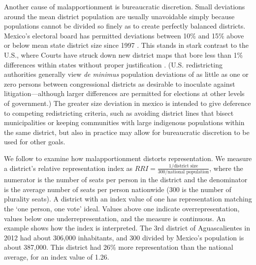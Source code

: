 \documentclass[letter,12pt]{article}
\begin{document}
{Another cause of malapportionment is bureaucratic discretion. Small deviations around the mean district population are usually unavoidable simply because populations cannot be divided so finely as to create perfectly balanced districts. Mexico's electoral board has permitted deviations between 10\% and 15\% above or below mean state district size since 1997 \citep{lujambio.vives.2008,trelles.mtz.polygob2012}. This stands in stark contrast to the U.S., where Courts have struck down new district maps that bore less than 1\% differences within states without proper justification \citep{tuckerApportionment.1985}.  (U.S. redistricting authorities generally view \emph{de minimus} population deviations of as little as one or zero persons between congressional districts as desirable to inoculate against litigation---although larger differences are permitted for elections at other levels of government.) The greater size deviation in mexico is intended to give deference to competing redistricting criteria, such as avoiding district lines that bisect municipalities or keeping communities with large indigenous populations within the same district, but also in practice may allow for bureaucratic discretion to be used for other goals. 

We follow \citet{ansolabehere.gerber.snyderCourtRedis2002} to examine how malapportionment distorts representation. We measure a district's relative representation index as $RRI = \frac{1/\text{district size}}{300/\text{national population}}$, where the numerator is the number of seats per person in the district and the denominator is the average number of seats per person nationwide (300 is the number of plurality seats). A district with an index value of one has representation matching the `one person, one vote' ideal. Values above one indicate overrepresentation, values below one underrepresentation, and the measure is continuous. An example shows how the index is interpreted. The 3rd district of Aguascalientes in 2012 had about 306,000 inhabitants, and 300 divided by Mexico's population is about 387,000. This district had 26\% more representation than the national average, for an index value of 1.26. 

}
\end{document}
